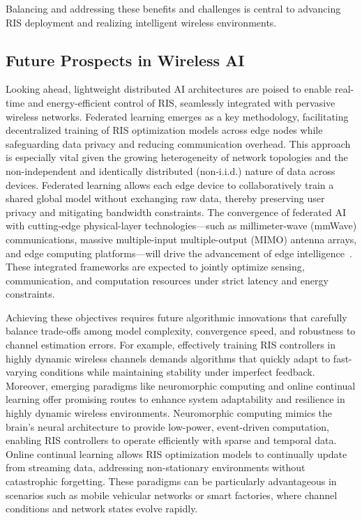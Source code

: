 \documentclass[sigconf]{acmart}
\begin{document}
Balancing and addressing these benefits and challenges is central to advancing RIS deployment and realizing intelligent wireless environments.

\subsection{Future Prospects in Wireless AI}

Looking ahead, lightweight distributed AI architectures are poised to enable real-time and energy-efficient control of RIS, seamlessly integrated with pervasive wireless networks. Federated learning emerges as a key methodology, facilitating decentralized training of RIS optimization models across edge nodes while safeguarding data privacy and reducing communication overhead. This approach is especially vital given the growing heterogeneity of network topologies and the non-independent and identically distributed (non-i.i.d.) nature of data across devices. Federated learning allows each edge device to collaboratively train a shared global model without exchanging raw data, thereby preserving user privacy and mitigating bandwidth constraints. The convergence of federated AI with cutting-edge physical-layer technologies—such as millimeter-wave (mmWave) communications, massive multiple-input multiple-output (MIMO) antenna arrays, and edge computing platforms—will drive the advancement of edge intelligence~\cite{ref49}. These integrated frameworks are expected to jointly optimize sensing, communication, and computation resources under strict latency and energy constraints.

Achieving these objectives requires future algorithmic innovations that carefully balance trade-offs among model complexity, convergence speed, and robustness to channel estimation errors. For example, effectively training RIS controllers in highly dynamic wireless channels demands algorithms that quickly adapt to fast-varying conditions while maintaining stability under imperfect feedback. Moreover, emerging paradigms like neuromorphic computing and online continual learning offer promising routes to enhance system adaptability and resilience in highly dynamic wireless environments. Neuromorphic computing mimics the brain's neural architecture to provide low-power, event-driven computation, enabling RIS controllers to operate efficiently with sparse and temporal data. Online continual learning allows RIS optimization models to continually update from streaming data, addressing non-stationary environments without catastrophic forgetting. These paradigms can be particularly advantageous in scenarios such as mobile vehicular networks or smart factories, where channel conditions and network states evolve rapidly.
\end{document}
